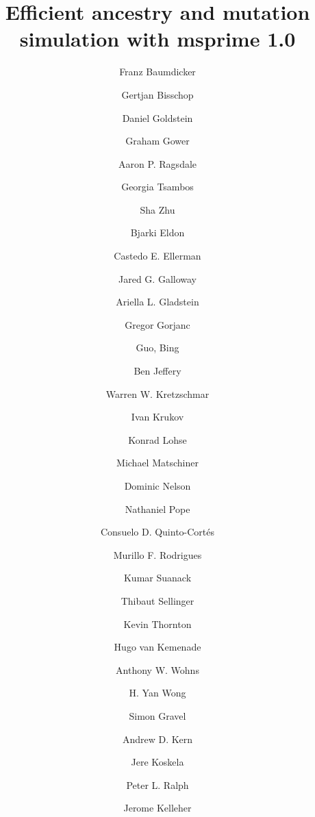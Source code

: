 \documentclass{article}
\begin{document}
\title{Efficient ancestry and mutation simulation with msprime 1.0}
\author[1,$\star$]{Franz Baumdicker}
\author[2,$\star$]{Gertjan Bisschop}
\author[3,$\star$]{Daniel Goldstein}
\author[4,$\star$]{Graham Gower}
\author[5,$\star$]{Aaron P. Ragsdale}
\author[6,$\star$]{Georgia Tsambos}
\author[7,$\star$]{Sha Zhu}

\author[8]{Bjarki Eldon}
\author[9]{Castedo E. Ellerman}
\author[10]{Jared G. Galloway}
\author[11]{Ariella L. Gladstein}
\author[12]{Gregor Gorjanc}
\author[13]{Guo, Bing}
\author[7]{Ben Jeffery}
\author[14]{Warren W. Kretzschmar}
\author[15]{Ivan Krukov}
\author[2]{Konrad Lohse}
\author[16]{Michael Matschiner}
\author[15]{Dominic Nelson}
\author[17]{Nathaniel Pope}
\author[18]{Consuelo D. Quinto-Cort\'es}
\author[10]{Murillo F. Rodrigues}
\author[19]{Kumar Suanack}
\author[20]{Thibaut Sellinger}
\author[21]{Kevin Thornton}
\author[22]{Hugo van Kemenade}
\author[7]{Anthony W. Wohns}
\author[7]{H. Yan Wong}

\author[15,$\dagger$]{Simon Gravel}
\author[10,$\dagger$]{Andrew D. Kern}
\author[23,$\dagger$]{Jere Koskela}
\author[10,24,$\dagger$]{Peter L. Ralph}

\author[7,$\ddagger$]{Jerome Kelleher}

\end{document}
